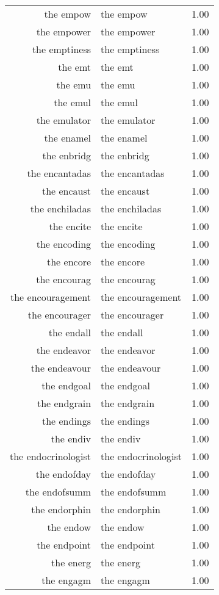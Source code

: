 \begin{table}[ht]
\begin{tabular}{rlr}
  the empow & the empow & 1.00 \\ 
  the empower & the empower & 1.00 \\ 
  the emptiness & the emptiness & 1.00 \\ 
  the emt & the emt & 1.00 \\ 
  the emu & the emu & 1.00 \\ 
  the emul & the emul & 1.00 \\ 
  the emulator & the emulator & 1.00 \\ 
  the enamel & the enamel & 1.00 \\ 
  the enbridg & the enbridg & 1.00 \\ 
  the encantadas & the encantadas & 1.00 \\ 
  the encaust & the encaust & 1.00 \\ 
  the enchiladas & the enchiladas & 1.00 \\ 
  the encite & the encite & 1.00 \\ 
  the encoding & the encoding & 1.00 \\ 
  the encore & the encore & 1.00 \\ 
  the encourag & the encourag & 1.00 \\ 
  the encouragement & the encouragement & 1.00 \\ 
  the encourager & the encourager & 1.00 \\ 
  the endall & the endall & 1.00 \\ 
  the endeavor & the endeavor & 1.00 \\ 
  the endeavour & the endeavour & 1.00 \\ 
  the endgoal & the endgoal & 1.00 \\ 
  the endgrain & the endgrain & 1.00 \\ 
  the endings & the endings & 1.00 \\ 
  the endiv & the endiv & 1.00 \\ 
  the endocrinologist & the endocrinologist & 1.00 \\ 
  the endofday & the endofday & 1.00 \\ 
  the endofsumm & the endofsumm & 1.00 \\ 
  the endorphin & the endorphin & 1.00 \\ 
  the endow & the endow & 1.00 \\ 
  the endpoint & the endpoint & 1.00 \\ 
  the energ & the energ & 1.00 \\ 
  the engagm & the engagm & 1.00 \\ 

\end{tabular}
\end{table}
